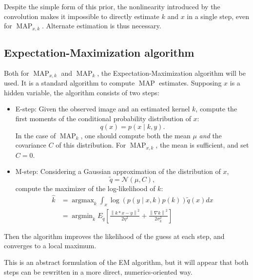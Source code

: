 \documentclass[english,a4paper]{article}
\theoremstyle{plain}
\theoremstyle{definition}
\theoremstyle{remark}
\DeclareMathOperator*{\argmin}{argmin}
\DeclareMathOperator*{\argmax}{argmax}
\DeclareMathOperator{\MAP}{MAP}
\newcommand{\norm}[1]{\left\lVert #1 \right\rVert}
\begin{document}
Despite the simple form of this prior, the nonlinearity introduced by the convolution makes it impossible to directly estimate $k$ and $x$ in a single step, even for $\MAP_{x,k}$. Alternate estimation is thus necessary.


\subsection{Expectation-Maximization algorithm}
Both for $\MAP_{x,k}$ and $\MAP_k$, the Expectation-Maximization algorithm will be used. It is a standard algorithm to compute $\MAP$ estimates.
Supposing $x$ is a hidden variable, the algorithm consists of two steps:
\begin{itemize}
	\item E-step:
	Given the observed image and an estimated kernel $k$, compute the first moments of the conditional probability distribution of $x$:
	\begin{equation}\label{eq:q}
	q(x) = p(x \mid k,y) .
	\end{equation}
	In the case of $\MAP_k$, one should compute both the mean $\mu$ \emph{and} the covariance $C$ of this distribution. For $\MAP_{x,k}$, the mean is sufficient, and set $C=0$.
	\item M-step:
	Considering a Gaussian approximation of the distribution of $x$,
	\[\tilde{q} = \mathcal{N}(\mu,C) ,\]
	compute the maximizer of the log-likelihood of $k$:
	\begin{align}\label{eq:M_step}
	\hat{k} 
	&= \argmax_k \int_x \log (p(y \mid x,k) p(k)) \tilde{q}(x) dx
	\\
	\label{eq:m_step_expectation}
	&= \argmin_k E_{\tilde{q}} \left[ \frac{\norm{k*x-y}^2}{2\eta^2} + \frac{\norm{\nabla k}^2}{2\sigma_k^2} \right]
	\end{align}	
\end{itemize}

Then the algorithm improves the likelihood of the guess at each step, and converges to a local maximum.

This is an abstract formulation of the EM algorithm, but it will appear that both steps can be rewritten in a more direct, numerics-oriented way.
\end{document}
